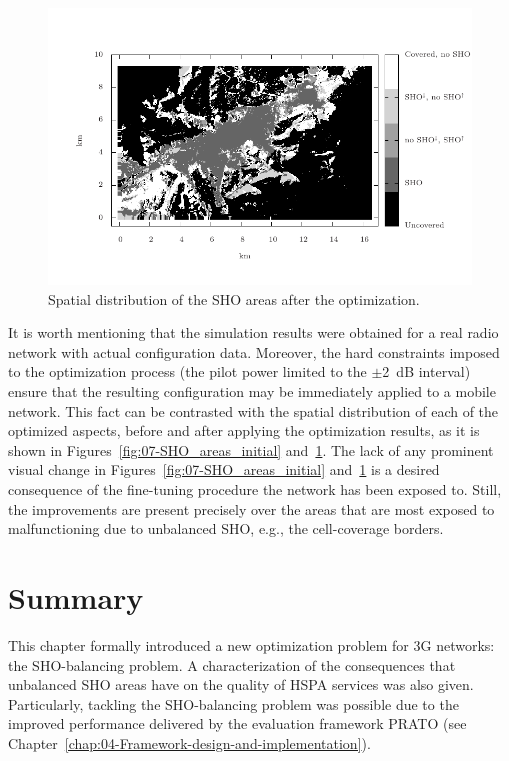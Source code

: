 \begin{figure}
\centering

\includegraphics[width=1\textwidth]{07-experimental_evaluation-sho_balancing/img/sho_areas_final}

\caption{Spatial distribution of the SHO areas after the optimization.\label{fig:07-SHO_areas_final}}
\end{figure}


It is worth mentioning that the simulation results were obtained for
a real radio network with actual configuration data. Moreover, the
hard constraints imposed to the optimization process (the pilot power
limited to the $\pm$2~dB interval) ensure that the resulting configuration
may be immediately applied to a mobile network. This fact can be contrasted
with the spatial distribution of each of the optimized aspects, before
and after applying the optimization results, as it is shown in Figures~\ref{fig:07-SHO_areas_initial}
and~\ref{fig:07-SHO_areas_final}. The lack of any prominent visual
change in Figures~\ref{fig:07-SHO_areas_initial} and~\ref{fig:07-SHO_areas_final}
is a desired consequence of the fine-tuning procedure the network
has been exposed to. Still, the improvements are present precisely
over the areas that are most exposed to malfunctioning due to unbalanced
SHO, e.g., the cell-coverage borders.


\section{Summary \label{sec:07-Summary}}

This chapter formally introduced a new optimization problem for 3G
networks: the SHO-balancing problem. A characterization of the consequences
that unbalanced SHO areas have on the quality of HSPA services was
also given. Particularly, tackling the SHO-balancing problem was possible
due to the improved performance delivered by the evaluation framework
PRATO (see Chapter~\ref{chap:04-Framework-design-and-implementation}).

